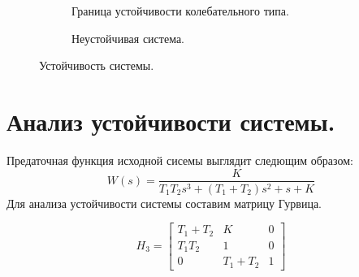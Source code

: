 \documentclass[a4paper, 11pt]{article}
\begin{document}
\begin{figure}[h!]
    \begin{subfigure}[b]{0.5\textwidth} 
        \centering
        \caption{Граница устойчивости колебательного типа.}
    \end{subfigure}
    \begin{subfigure}[b]{0.5\textwidth} 
        \centering
       \caption{Неустойчивая система.}
    \end{subfigure}
    \caption{Устойчивость системы.}
\end{figure}

\section*{Анализ устойчивости системы.}
Предаточная функция исходной сисемы выглядит следющим образом:
\begin{equation}
    W(s) = \frac{K}{T_1 T_2 s^3 + (T_1 + T_2)s^2 + s + K}
\end{equation}
Для анализа устойчивости системы составим матрицу Гурвица.

\begin{equation}
    H_3 = \begin{bmatrix}
        T_1 + T_2 &  K & 0 \\
        T_1 T_2 & 1 & 0 \\
        0 & T_1 + T_2 & 1
    \end{bmatrix}
\end{equation}
\end{document}
